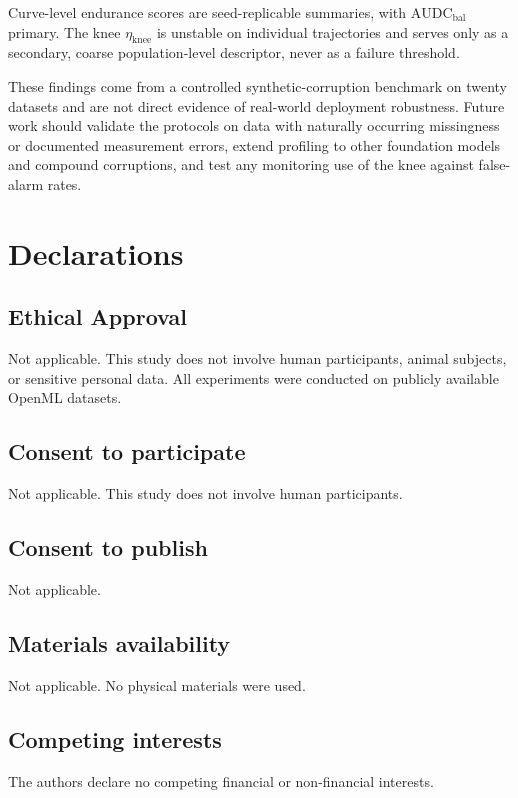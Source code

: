 \documentclass[pdflatex,sn-mathphys]{sn-jnl}
\theoremstyle{thmstyleone}
\theoremstyle{thmstyletwo}
\theoremstyle{thmstylethree}
\newcommand{\AUDC}{\mathrm{AUDC}}
\newcommand{\etaknee}{\eta_{\mathrm{knee}}}
\begin{document}
Curve-level endurance scores are seed-replicable summaries, with $\AUDC_{\mathrm{bal}}$ primary. The knee $\etaknee$ is unstable on individual trajectories and serves only as a secondary, coarse population-level descriptor, never as a failure threshold.

These findings come from a controlled synthetic-corruption benchmark on twenty datasets and are not direct evidence of real-world deployment robustness. Future work should validate the protocols on data with naturally occurring missingness or documented measurement errors, extend profiling to other foundation models and compound corruptions, and test any monitoring use of the knee against false-alarm rates.


\backmatter

\section*{Declarations}\label{sec:declarations}

\subsection*{Ethical Approval}
Not applicable. This study does not involve human participants, animal subjects, or sensitive personal data. All experiments were conducted on publicly available OpenML datasets.

\subsection*{Consent to participate}
Not applicable. This study does not involve human participants.

\subsection*{Consent to publish}
Not applicable.

\subsection*{Materials availability}
Not applicable. No physical materials were used.

\subsection*{Competing interests}
The authors declare no competing financial or non-financial interests.
\end{document}
